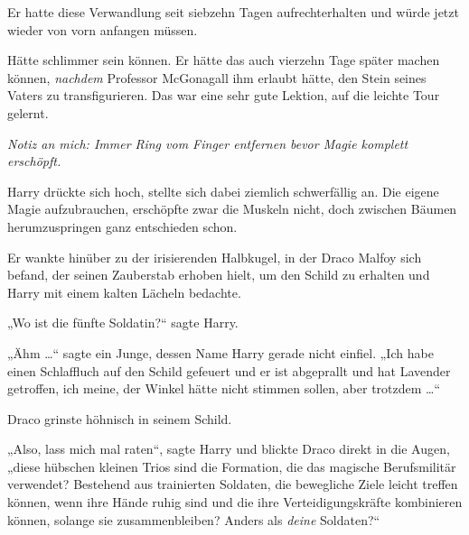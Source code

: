 Er hatte diese Verwandlung seit siebzehn Tagen aufrechterhalten und würde jetzt wieder von vorn anfangen müssen.

Hätte schlimmer sein können. Er hätte das auch vierzehn Tage später machen können, \emph{nachdem} Professor McGonagall ihm erlaubt hätte, den Stein seines Vaters zu transfigurieren. Das war eine sehr gute Lektion, auf die leichte Tour gelernt.

\emph{Notiz an mich: Immer Ring vom Finger entfernen bevor Magie komplett erschöpft.}

Harry drückte sich hoch, stellte sich dabei ziemlich schwerfällig an. Die eigene Magie aufzubrauchen, erschöpfte zwar die Muskeln nicht, doch zwischen Bäumen herumzuspringen ganz entschieden schon.

Er wankte hinüber zu der irisierenden Halbkugel, in der Draco Malfoy sich befand, der seinen Zauberstab erhoben hielt, um den Schild zu erhalten und Harry mit einem kalten Lächeln bedachte.

„Wo ist die fünfte Soldatin?“ sagte Harry.

„Ähm …“ sagte ein Junge, dessen Name Harry gerade nicht einfiel.
„Ich habe einen Schlaffluch auf den Schild gefeuert und er ist abgeprallt und hat Lavender getroffen, ich meine, der Winkel hätte nicht stimmen sollen, aber trotzdem …“

Draco grinste höhnisch in seinem Schild.

„Also, lass mich mal raten“, sagte Harry und blickte Draco direkt in die Augen, „diese hübschen kleinen Trios sind die Formation, die das magische Berufsmilitär verwendet? Bestehend aus trainierten Soldaten, die bewegliche Ziele leicht treffen können, wenn ihre Hände ruhig sind und die ihre Verteidigungskräfte kombinieren können, solange sie zusammenbleiben? Anders als \emph{deine} Soldaten?“

